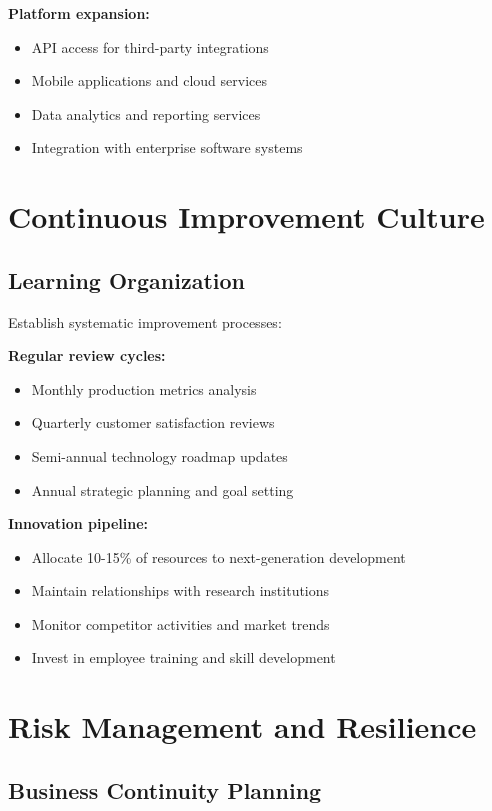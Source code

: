 \textbf{Platform expansion:}
\begin{itemize}
\item API access for third-party integrations
\item Mobile applications and cloud services
\item Data analytics and reporting services
\item Integration with enterprise software systems
\end{itemize}

\section{Continuous Improvement Culture}

\subsection{Learning Organization}

Establish systematic improvement processes:

\textbf{Regular review cycles:}
\begin{itemize}
\item Monthly production metrics analysis
\item Quarterly customer satisfaction reviews
\item Semi-annual technology roadmap updates
\item Annual strategic planning and goal setting
\end{itemize}

\textbf{Innovation pipeline:}
\begin{itemize}
\item Allocate 10-15\% of resources to next-generation development
\item Maintain relationships with research institutions
\item Monitor competitor activities and market trends
\item Invest in employee training and skill development
\end{itemize}

\section{Risk Management and Resilience}

\subsection{Business Continuity Planning}

